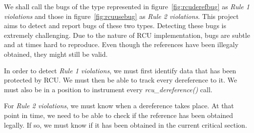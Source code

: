 We shall call the bugs of the type represented in figure~\ref{fig:rcuderefbug} as \emph{Rule 1 violations}
and those in figure~\ref{fig:rcuusebug} as \emph{Rule 2 violations}.
This project aims to detect and report bugs of these two types. Detecting these bugs is extremely challenging. Due to the nature of RCU implementation,
bugs are subtle and at times hard to reproduce. Even though the references have been illegaly obtained, they might still be valid.

In order to detect \emph{Rule 1 violations}, we must first identify data
that has been protected by RCU. We must then be able to track every
dereference to it. We must also be in a position to instrument
every \emph{rcu\_dereference()} call.

For \emph{Rule 2 violations}, we must know when a dereference takes place.
At that point in time, we need to be able to check if the reference has
been obtained legally. If so, we must know if it has been obtained in
the current critical section.





%







